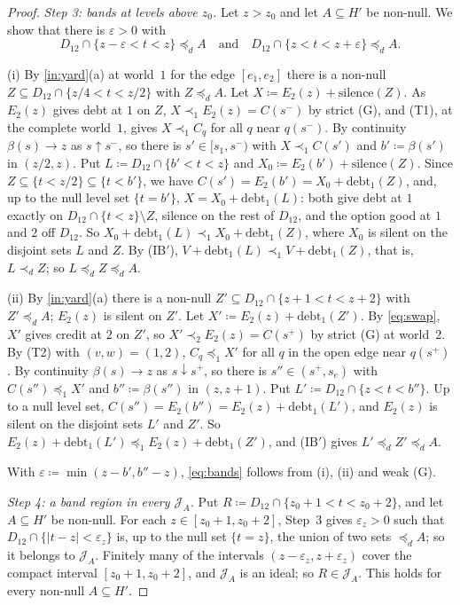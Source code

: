 \documentclass[11pt]{article}
\theoremstyle{definition}\newtheorem{definition}[theorem]{Definition}
\theoremstyle{remark}\newtheorem{remark}[theorem]{Remark}
\newcommand{\debt}{\mathrm{debt}}
\newcommand{\sil}{\mathrm{silence}}
\newcommand{\Jid}{\mathcal J}
\begin{document}
\begin{proof}
\emph{Step 3: bands at levels above $z_0$.} Let $z>z_0$ and let
$A\subseteq H'$ be non-null. We show that there is $\varepsilon>0$ with
\begin{equation}
 D_{12}\cap\{z-\varepsilon<t<z\}\preceq_dA\quad\text{and}\quad
 D_{12}\cap\{z<t<z+\varepsilon\}\preceq_dA.
 \label{eq:bands}
\end{equation}

(i) By \ref{in:yard}(a) at world~$1$ for the edge $[e_1,e_2]$ there is a
non-null $Z\subseteq D_{12}\cap\{z/4<t<z/2\}$ with $Z\preceq_dA$. Let
$X\coloneqq E_2(z)+\sil(Z)$. As $E_2(z)$ gives debt at $1$ on $Z$,
$X\prec_1E_2(z)=C(s^-)$ by strict (G), and (T1), at the complete
world~$1$, gives $X\prec_1C_q$ for all $q$ near $q(s^-)$. By continuity
$\beta(s)\to z$ as $s\uparrow s^-$, so there is $s'\in[s_1,s^-)$ with
$X\prec_1C(s')$ and $b'\coloneqq\beta(s')$ in $(z/2,z)$. Put
$L\coloneqq D_{12}\cap\{b'<t<z\}$ and $X_0\coloneqq E_2(b')+\sil(Z)$. Since
$Z\subseteq\{t<z/2\}\subseteq\{t<b'\}$, we have
$C(s')=E_2(b')=X_0+\debt_1(Z)$, and, up to the null level set $\{t=b'\}$,
$X=X_0+\debt_1(L)$: both give debt at $1$ exactly on
$D_{12}\cap\{t<z\}\setminus Z$, silence on the rest of $D_{12}$, and the
option good at $1$ and $2$ off $D_{12}$. So
$X_0+\debt_1(L)\prec_1X_0+\debt_1(Z)$, where $X_0$ is silent on the disjoint
sets $L$ and $Z$. By (IB$'$), $V+\debt_1(L)\prec_1V+\debt_1(Z)$, that is,
$L\prec_dZ$; so $L\preceq_dZ\preceq_dA$.

(ii) By \ref{in:yard}(a) there is a non-null
$Z'\subseteq D_{12}\cap\{z+1<t<z+2\}$ with $Z'\preceq_dA$; $E_2(z)$ is
silent on $Z'$. Let $X'\coloneqq E_2(z)+\debt_1(Z')$. By \eqref{eq:swap},
$X'$ gives credit at $2$ on $Z'$, so $X'\prec_2E_2(z)=C(s^+)$ by strict (G)
at world~$2$. By (T2) with $(v,w)=(1,2)$, $C_q\preceq_1X'$ for all $q$ in
the open edge near $q(s^+)$. By continuity $\beta(s)\to z$ as $s\downarrow
s^+$, so there is $s''\in(s^+,s_e)$ with $C(s'')\preceq_1X'$ and
$b''\coloneqq\beta(s'')$ in $(z,z+1)$. Put $L'\coloneqq D_{12}\cap
\{z<t<b''\}$. Up to a null level set, $C(s'')=E_2(b'')=E_2(z)+\debt_1(L')$,
and $E_2(z)$ is silent on the disjoint sets $L'$ and $Z'$. So
$E_2(z)+\debt_1(L')\preceq_1E_2(z)+\debt_1(Z')$, and (IB$'$) gives
$L'\preceq_dZ'\preceq_dA$.

With $\varepsilon\coloneqq\min(z-b',b''-z)$, \eqref{eq:bands} follows from
(i), (ii) and weak (G).

\emph{Step 4: a band region in every $\Jid_A$.} Put
$R\coloneqq D_{12}\cap\{z_0+1<t<z_0+2\}$, and let $A\subseteq H'$ be
non-null. For each $z\in[z_0+1,z_0+2]$, Step~3 gives $\varepsilon_z>0$ such
that $D_{12}\cap\{|t-z|<\varepsilon_z\}$ is, up to the null set $\{t=z\}$,
the union of two sets $\preceq_dA$; so it belongs to $\Jid_A$. Finitely many
of the intervals $(z-\varepsilon_z,z+\varepsilon_z)$ cover the compact
interval $[z_0+1,z_0+2]$, and $\Jid_A$ is an ideal; so $R\in\Jid_A$. This
holds for every non-null $A\subseteq H'$.


\end{proof}
\end{document}
